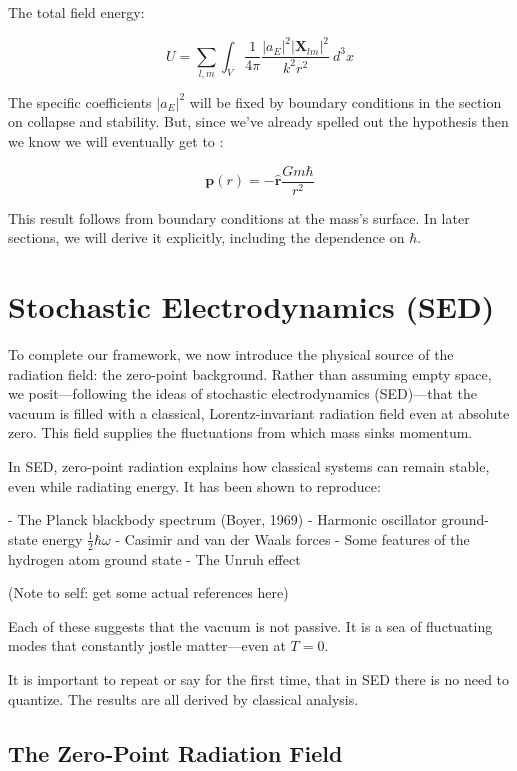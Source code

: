 \documentclass {article}
\renewcommand\vec{\mathbf}
\let\OldHat\hat
\renewcommand{\hat}[1]{\OldHat{\mathbf{#1}}}
\begin{document}
The total field energy:

\begin{equation}
U  =\sum_{l, m}   \int_V \frac 1 {4 \pi}  \frac {|a_E|^2 |\vec X_{lm} |^2}{k^2 r^2} ~ d^3x 
\label{eq:energy}
\end{equation}

The specific coefficients \( |a_E|^2 \) will be fixed by boundary conditions in the section on collapse and stability. But, since we've already spelled out the hypothesis then we know we will eventually get to
:

\begin{equation}
\boxed{
	\vec{p}(r) = -\hat{r} \frac{G m \hbar}{r^2}
}
\end{equation}

This result follows from boundary conditions at the mass’s surface. In later sections, we will derive it explicitly, including the dependence on \( \hbar \).

\section{Stochastic Electrodynamics (SED)}

To complete our framework, we now introduce the physical source of the radiation field: the zero-point background. Rather than assuming empty space, we posit—following the ideas of stochastic electrodynamics (SED)—that the vacuum is filled with a classical, Lorentz-invariant radiation field even at absolute zero. This field supplies the fluctuations from which mass sinks momentum.

In SED, zero-point radiation explains how classical systems can remain stable, even while radiating energy. It has been shown to reproduce:

- The Planck blackbody spectrum (Boyer, 1969)
- Harmonic oscillator ground-state energy \( \tfrac{1}{2} \hbar \omega \)
- Casimir and van der Waals forces
- Some features of the hydrogen atom ground state
- The Unruh effect

(Note to self: get some actual references here)

Each of these suggests that the vacuum is not passive. It is a sea of fluctuating modes that constantly jostle matter—even at \( T = 0 \). 

It is important to repeat or say for the first time, that in SED there is no need to quantize. The results are all derived by classical analysis.


\subsection{The Zero-Point Radiation Field}
\end{document}
